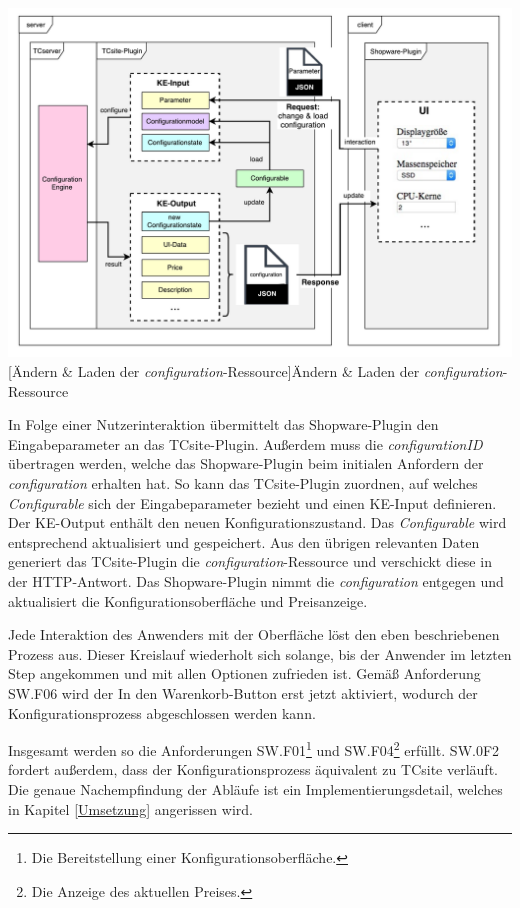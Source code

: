 \documentclass[11pt, a4paper, titlepage, listof=totoc, bibliography=totoc, index=totoc, twoside, openright, headings=normal]{scrreprt}
\begin{document}
\vspace{1em}
\begin{minipage}{\linewidth}
	\centering
	\includegraphics[width=0.9\linewidth]{Abbildungen/konzeptChange.pdf}
	[Ändern \& Laden der \emph{configuration}-Ressource]{Ändern \& Laden der \emph{configuration}-Ressource}
	\label{fig:konzeptChange}
\end{minipage}
\vspace{0.3em}

In Folge einer Nutzerinteraktion übermittelt das Shopware-Plugin den Eingabeparameter an das TCsite-Plugin. Außerdem muss die \emph{configurationID} übertragen werden, welche das Shopware-Plugin beim initialen Anfordern der \emph{configuration} erhalten hat. So kann das TCsite-Plugin zuordnen, auf welches \emph{Configurable} sich der Eingabeparameter bezieht und einen KE-Input definieren. Der KE-Output enthält den neuen Konfigurationszustand. Das \emph{Configurable} wird entsprechend aktualisiert und gespeichert. Aus den übrigen relevanten Daten generiert das TCsite-Plugin die \emph{configuration}-Ressource und verschickt diese in der HTTP-Antwort. Das Shopware-Plugin nimmt die \emph{configuration} entgegen und aktualisiert die Konfigurationsoberfläche und Preisanzeige.

Jede Interaktion des Anwenders mit der Oberfläche löst den eben beschriebenen Prozess aus. Dieser Kreislauf wiederholt sich solange, bis der Anwender im letzten Step angekommen und mit allen Optionen zufrieden ist. Gemäß Anforderung SW.F06 wird der \glqq In den Warenkorb\grqq{}-Button erst jetzt aktiviert, wodurch der Konfigurationsprozess abgeschlossen werden kann.

Insgesamt werden so die Anforderungen SW.F01\footnote{Die Bereitstellung einer Konfigurationsoberfläche.} und SW.F04\footnote{Die Anzeige des aktuellen Preises.} erfüllt. SW.0F2 fordert außerdem, dass der Konfigurationsprozess äquivalent zu TCsite verläuft. Die genaue Nachempfindung der Abläufe ist ein Implementierungsdetail, welches in Kapitel \ref{Umsetzung} angerissen wird.
\end{document}
